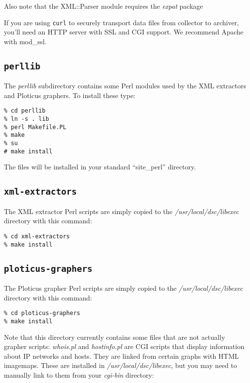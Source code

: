 \documentclass{report}
\begin{document}
\noindent
Also note that the XML::Parser module requires the {\em expat\/} package

If you are using {\tt curl\/} to securely transport data files from
collector to archiver, you'll need an HTTP server with SSL and CGI support.
We recommend Apache with mod\_ssl.

\subsection{\tt perllib}

The {\em perllib\/} subdirectory contains some Perl modules
used by the XML extractors and Ploticus graphers.  To install
these type:

\begin{verbatim}
% cd perllib
% ln -s . lib
% perl Makefile.PL
% make
% su
# make install
\end{verbatim}

\noindent
The files will be installed in your standard ``site\_perl'' directory.

\subsection{\tt xml-extractors}

The XML extractor Perl scripts are simply copied to the
{\em /usr/local/dsc/libexec\/} directory with this command:

\begin{verbatim}
% cd xml-extractors
% make install
\end{verbatim}

\subsection{\tt ploticus-graphers}

The Ploticus grapher Perl scripts are simply copied to the
{\em /usr/local/dsc/libexec\/} directory with this command:

\begin{verbatim}
% cd ploticus-graphers
% make install
\end{verbatim}

\noindent
Note that this directory currently contains some files that are not
actually grapher scripts: {\em whois.pl\/} and {\em hostinfo.pl\/}
are CGI scripts that display information about IP networks and hosts.
They are linked from certain graphs with HTML imagemaps.  These are
installed in {\em /usr/local/dsc/libexec\/}, but you may need to manually
link to them from your {\em cgi-bin\/} directory:
\end{document}
